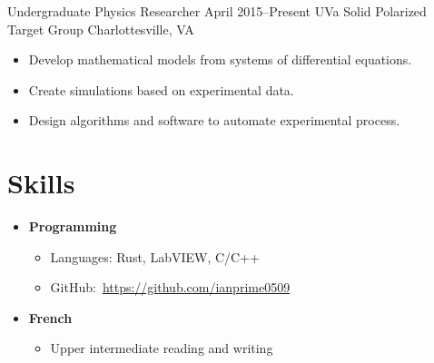 \documentclass[12pt]{article}
\begin{document}
\entry
    {Undergraduate Physics Researcher}
    {April 2015--Present}
    {UVa Solid Polarized Target Group}
    {Charlottesville, VA}
\begin{itemize}
    \item Develop mathematical models from systems of differential equations.
    \item Create simulations based on experimental data.
    \item Design algorithms and software to automate experimental process.
\end{itemize}

\section*{Skills}
\begin{itemize}
    \item {\bf Programming}
    \begin{itemize}
        \item Languages: Rust, LabVIEW, C/C++
        \item GitHub:~\url{https://github.com/ianprime0509}
    \end{itemize}
    \item {\bf French}
    \begin{itemize}
        \item Upper intermediate reading and writing
    \end{itemize}
\end{itemize}
\end{document}
